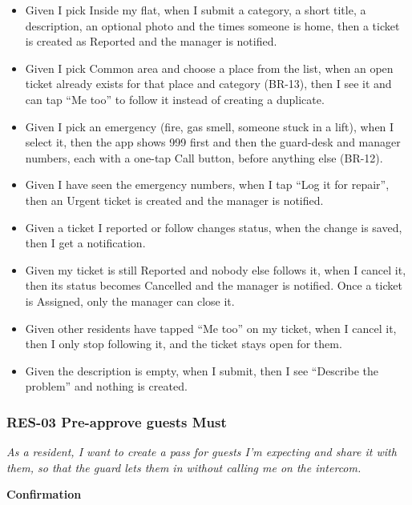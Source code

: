 \documentclass[11pt,a4paper]{report}
\begin{document}
\begin{itemize}
  \item Given I pick Inside my flat, when I submit a category, a short title, a description, an optional photo and the times someone is home, then a ticket is created as Reported and the manager is notified.
  \item Given I pick Common area and choose a place from the list, when an open ticket already exists for that place and category (BR-13), then I see it and can tap ``Me too'' to follow it instead of creating a duplicate.
  \item Given I pick an emergency (fire, gas smell, someone stuck in a lift), when I select it, then the app shows 999 first and then the guard-desk and manager numbers, each with a one-tap Call button, before anything else (BR-12).
  \item Given I have seen the emergency numbers, when I tap ``Log it for repair'', then an Urgent ticket is created and the manager is notified.
  \item Given a ticket I reported or follow changes status, when the change is saved, then I get a notification.
  \item Given my ticket is still Reported and nobody else follows it, when I cancel it, then its status becomes Cancelled and the manager is notified. Once a ticket is Assigned, only the manager can close it.
  \item Given other residents have tapped ``Me too'' on my ticket, when I cancel it, then I only stop following it, and the ticket stays open for them.
  \item Given the description is empty, when I submit, then I see ``Describe the problem'' and nothing is created.
\end{itemize}

\subsubsection*{RES-03 \textperiodcentered{} Pre-approve guests \textperiodcentered{} Must}

\emph{As a resident, I want to create a pass for guests I'm expecting and share it with them, so that the guard lets them in without calling me on the intercom.}

\medskip\noindent\textbf{Confirmation}\par
\end{document}
